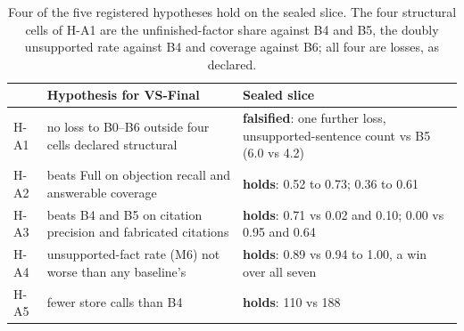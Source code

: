 \documentclass[11pt]{article}
\newcommand{\vs}{VS-Final}
\begin{document}
\begin{table}[t]
\centering\small
\setlength\tabcolsep{3pt}
\begin{tabular}{@{}lL{3.0cm}L{3.15cm}@{}}
\toprule
 & Hypothesis for \vs{} & Sealed slice \\
\midrule
H-A1 & no loss to B0--B6 outside four cells declared structural & \textbf{falsified}: one further loss, unsupported-sentence count vs B5 (6.0 vs 4.2) \\
H-A2 & beats Full on objection recall and answerable coverage & \textbf{holds}: 0.52 to 0.73; 0.36 to 0.61 \\
H-A3 & beats B4 and B5 on citation precision and fabricated citations & \textbf{holds}: 0.71 vs 0.02 and 0.10; 0.00 vs 0.95 and 0.64 \\
H-A4 & unsupported-fact rate (M6) not worse than any baseline's & \textbf{holds}: 0.89 vs 0.94 to 1.00, a win over all seven \\
H-A5 & fewer store calls than B4 & \textbf{holds}: 110 vs 188 \\
\bottomrule
\end{tabular}
\caption{Four of the five registered hypotheses hold on the sealed slice. The four structural cells of H-A1 are the unfinished-factor share against B4 and B5, the doubly unsupported rate against B4 and coverage against B6; all four are losses, as declared.}
\label{tab:hyp}
\end{table}
\end{document}
